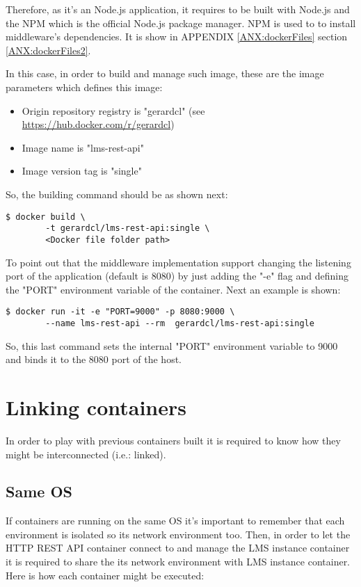 Therefore, as it's an Node.js application, it requires to be built with Node.js and the NPM which is the official Node.js package manager. NPM is used to to install middleware's dependencies. It is show in APPENDIX \ref{ANX:dockerFiles} section \ref{ANX:dockerFiles2}.

In this case, in order to build and manage such image, these are the image parameters which defines this image:

\begin{itemize}
\item Origin repository registry is "gerardcl" (see \url{https://hub.docker.com/r/gerardcl})
\item Image name is "lms-rest-api"
\item Image version tag is "single"
\end{itemize}

So, the building command should be as shown next:

\begin{verbatim}
$ docker build \
		-t gerardcl/lms-rest-api:single \
		<Docker file folder path>
\end{verbatim}

To point out that the middleware implementation support changing the listening port of the application (default is 8080) by just adding the "-e" flag and defining the "PORT" environment variable of the container. Next an example is shown:

\begin{verbatim}
$ docker run -it -e "PORT=9000" -p 8080:9000 \
		--name lms-rest-api --rm  gerardcl/lms-rest-api:single
\end{verbatim}

So, this last command sets the internal "PORT" environment variable to 9000 and binds it to the 8080 port of the host.

\section{Linking containers}

In order to play with previous containers built it is required to know how they might be interconnected (i.e.: linked).

\subsection{Same OS}

If containers are running on the same OS it's important to remember that each environment is isolated so its network environment too. Then, in order to let the HTTP REST API container connect to and manage the LMS instance container it is required to share the its network environment with LMS instance container. Here is how each container might be executed:

